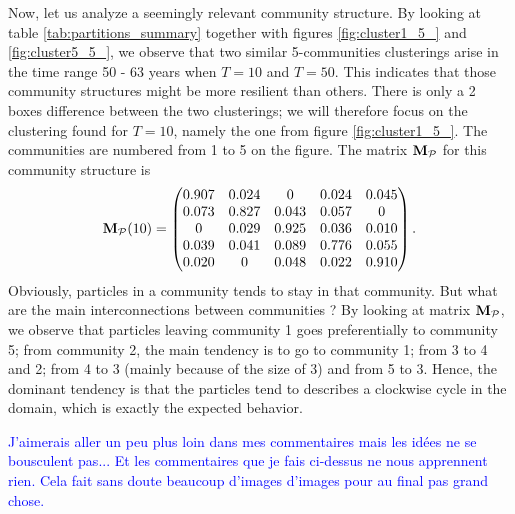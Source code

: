 Now, let us analyze a seemingly relevant community structure. By looking at table \ref{tab:partitions_summary} together with figures \ref{fig:cluster1_5_} and \ref{fig:cluster5_5_}, we observe that two similar 5-communities clusterings arise in the time range 50 - 63 years when $T = 10$ and $T = 50$. This indicates that those community structures might be more resilient than others. There is only a 2 boxes difference between the two clusterings; we will therefore focus on the clustering found for $T = 10$, namely the one from figure \ref{fig:cluster1_5_}. The communities are numbered from 1 to 5 on the figure. The matrix $\mathbf M_{\mathcal{P}}$ for this community structure is
\begin{equation}
	\mathbf M_{\mathcal{P}}(10) = 
	\begin{pmatrix}
	0.907 & 0.024 &     0 & 0.024 & 0.045\\
    0.073 & 0.827 & 0.043 & 0.057 & 0\\
        0 & 0.029 & 0.925 & 0.036 & 0.010\\
    0.039 & 0.041 & 0.089 & 0.776 & 0.055\\
    0.020 &     0 & 0.048 & 0.022 & 0.910\\
	\end{pmatrix}.
\end{equation}
Obviously, particles in a community tends to stay in that community. But what are the main interconnections between communities ? By looking at matrix $\mathbf M_{\mathcal{P}}$, we observe that particles leaving community 1 goes preferentially to community 5; from community 2, the main tendency is to go to community 1; from 3 to 4 and 2; from 4 to 3 (mainly because of the size of 3) and from 5 to 3. Hence, the dominant tendency is that the particles tend to describes a clockwise cycle in the domain, which is exactly the expected behavior. 

\textcolor{blue}{J'aimerais aller un peu plus loin dans mes commentaires mais les idées ne se bousculent pas... Et les commentaires que je fais ci-dessus ne nous apprennent rien. Cela fait sans doute beaucoup d'images d'images pour au final pas grand chose.}

